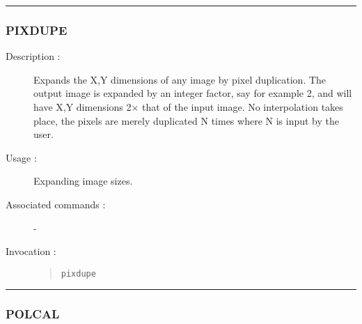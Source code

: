 \hrule
\subsubsection*{\label{PIXDUPE}PIXDUPE}

\begin{description}

\item[Description :] Expands the X,Y dimensions of any image by pixel
duplication. The output image is expanded by an integer factor, say for
example 2, and will have X,Y dimensions 2$\times$ that of the input
image.  No interpolation takes place, the pixels are merely duplicated
N times where N is input by the user.

\item[Usage :] Expanding image sizes.
\item[Associated commands :] -
\item[Invocation :]

\begin{quote}{\tt  pixdupe }\end{quote}

\end{description}

\hrule
\subsubsection*{\label{POLCAL}POLCAL}

